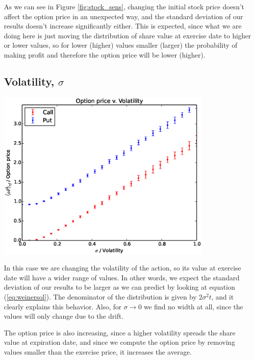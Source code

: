 \documentclass[8 pt]{article}
\newenvironment{Figure}
  {\par\medskip\noindent\minipage{\linewidth}}
  {\endminipage\par\medskip}
\begin{document}
\begin{multicols*}{2}
As we can see in Figure \ref{fig:stock_sens}, changing the initial stock price doesn't affect the option price in an unexpected way, and the standard deviation of our results doesn't increase significantly either. This is expected, since what we are doing here is just moving the distribution of share value at exercise date to higher or lower values, so for lower (higher) values smaller (larger) the probability of making profit and therefore the option price will be lower (higher).

\subsection{Volatility, $\sigma$}

\begin{Figure}
  \begin{center}
    \includegraphics[width=0.8\textwidth]{graphs/oP_vol.eps}
    \label{fig:vol_sens}
  \end{center}
\end{Figure}

In this case we are changing the volatility of the action, so its value at exercise date will have a wider range of values. In other words, we expect the standard deviation of our results to be larger as we can predict by looking at equation (\ref{eq:weinersol}). The denominator of the distribution is given by $2\sigma^2 t$, and it clearly explains this behavior. Also, for $\sigma\rightarrow0$ we find no width at all, since the values will only change due to the drift.

The option price is also increasing, since a higher volatility spreads the share value at expiration date, and since we compute the option price by removing values smaller than the exercise price, it increases the average.


\end{multicols*}
\end{document}
